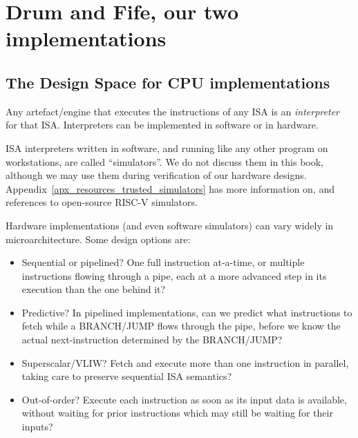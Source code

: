 \vspace{1ex}



\section{Drum and Fife, our two implementations}

\label{Sec_Drum_and_Fife}


\subsection{The Design Space for CPU implementations}

\label{Sec_Interpreters}

Any artefact/engine that executes the instructions of any ISA is an
\emph{interpreter} for that ISA.  Interpreters can be implemented in
software or in hardware.

ISA interpreters written in software, and running like any other
program on workstations, are called ``simulators''.  We do not discuss
them in this book, although we may use them during verification of our
hardware designs.  Appendix~\ref{apx_resources_trusted_simulators} has
more information on, and references to open-source RISC-V simulators.

Hardware implementations (and even software simulators) can vary
widely in microarchitecture.  Some design options are:

\begin{itemize}

  \item Sequential or pipelined?  One full instruction at-a-time, or
    multiple instructions flowing through a pipe, each at a more
    advanced step in its execution than the one behind it?

  \item Predictive? In pipelined implementations, can we predict what
    instructions to fetch while a BRANCH/JUMP flows through the pipe,
    before we know the actual next-instruction determined by the
    BRANCH/JUMP?

  \item Superscalar/VLIW? Fetch and execute more than one instruction
    in parallel, taking care to preserve sequential ISA semantics?

  \item Out-of-order? Execute each instruction as soon as its input
    data is available, without waiting for prior instructions which
    may still be waiting for their inputs?

\end{itemize}

